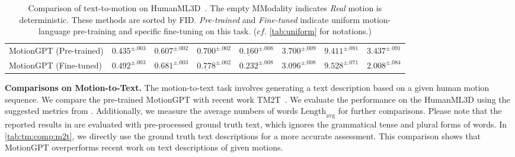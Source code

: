 \begin{table}[t]
{\begin{tabular}{@{}lccccccc@{}}
\midrule
MotionGPT (Pre-trained) &
${0.435}^{\pm.003}$ & $0.607^{\pm.002}$ & $0.700^{\pm.002}$ & $\underline{0.160}^{\pm.008}$ & $3.700^{\pm.009}$ & $9.411^{\pm.081}$ & $\boldsymbol{3.437}^{\pm.091}$
\\
MotionGPT (Fine-tuned) &
$\boldsymbol{0.492}^{\pm.003}$ & $\boldsymbol{0.681}^{\pm.003}$ & $\underline{0.778}^{\pm.002}$ & $0.232^{\pm.008}$ & $\boldsymbol{3.096}^{\pm.008}$ & $\boldsymbol{9.528}^{\pm.071}$ & 
${2.008}^{\pm.084}$

   \\ \bottomrule
\end{tabular}%
}
\vspace{5pt}
\caption{Comparison of text-to-motion on HumanML3D~\cite{Guo_2022_CVPR_humanml3d}. The empty MModality indicates \textit{Real} motion is deterministic. These methods are sorted by FID. \textit{Pre-trained} and \textit{Fine-tuned} indicate uniform motion-language pre-training and specific fine-tuning on this task. ($cf.$ \cref{tab:uniform} for notations.)}
\vspace{-5pt}
\label{tab:tm:comp:humanml3d}
\end{table}


\label{sec:comp:m2t}
\textbf{Comparisons on Motion-to-Text.}
The motion-to-text task involves generating a text description based on a given human motion sequence. 
We compare the pre-trained MotionGPT with recent work TM2T~\cite{chuan2022tm2t}. We evaluate the performance on the HumanML3D using the suggested metrics from \cite{chuan2022tm2t}. Additionally, we measure the average numbers of words $\text{Length}_\text{avg}$ for further comparisons. Please note that the reported results in \cite{chuan2022tm2t} are evaluated with pre-processed ground truth text, which ignores the grammatical tense and plural forms of words. In \cref{tab:tm:comp:m2t}, we directly use the ground truth text descriptions for a more accurate assessment. This comparison shows that MotionGPT overperforms recent work on text descriptions of given motions.


